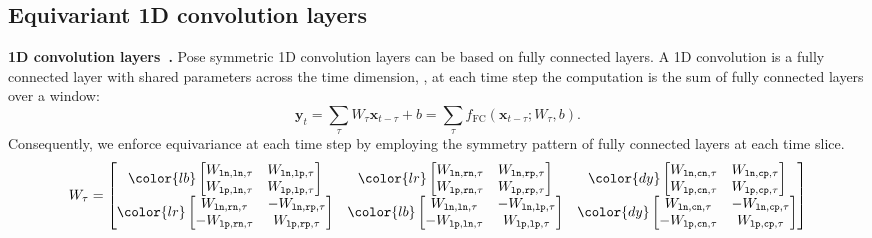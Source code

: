 \documentclass{article}
\def\rvx{{\mathbf{x}}}
\def\rvy{{\mathbf{y}}}
\begin{document}
\subsection{Equivariant 1D convolution layers}
{
\textbf{1D convolution layers~\cite{waibel1995phoneme, lecun1999object}.}
}
Pose symmetric 1D convolution layers can be based on fully connected layers. A 1D convolution is a fully connected layer with shared parameters across the time dimension, \ie, at each time step the computation is the sum of fully connected layers over a window:
$$\rvy_t = \sum\limits_{\tau} W_{\tau}\rvx_{t-\tau} + b = \sum\limits_{\tau}  f_{\text{FC}}(\rvx_{t-\tau}; W_{\tau}, b).$$ 
Consequently, we  enforce equivariance at each time step by employing the  symmetry pattern of fully connected layers at each time slice. 
$$
W_{\tau} = \begin{bmatrix}
{\color{lb}
\begin{bmatrix}
W_{\tt ln, ln, \tau} & W_{\tt ln, lp, \tau} \\
W_{\tt lp, ln, \tau} & W_{\tt lp, lp, \tau}\\
\end{bmatrix}
} 
& 
{\color{lr}
\begin{bmatrix}
W_{\tt ln, rn, \tau} & W_{\tt ln, rp, \tau} \\
W_{\tt lp,rn, \tau} & W_{\tt lp, rp, \tau}\\
\end{bmatrix}
}
&
{\color{dy}
\begin{bmatrix}
W_{\tt ln, cn, \tau} & W_{\tt ln, cp, \tau} \\
W_{\tt lp, cn, \tau} & W_{\tt lp, cp, \tau}\\
\end{bmatrix}
}\\
{\color{lr}
\begin{bmatrix}
W_{\tt ln, rn, \tau} & -W_{\tt ln, rp, \tau} \\
-W_{\tt lp,rn, \tau} & W_{\tt lp, rp, \tau}\\
\end{bmatrix}
}
& 
{\color{lb}
\begin{bmatrix}
W_{\tt ln, ln, \tau} & -W_{\tt ln, lp, \tau} \\
-W_{\tt lp, ln, \tau} & W_{\tt lp, lp, \tau}\\
\end{bmatrix}
} 
&
{\color{dy}
\begin{bmatrix}
W_{\tt ln, cn, \tau} & -W_{\tt ln, cp, \tau} \\
-W_{\tt lp, cn, \tau} & W_{\tt lp, cp, \tau}\\

\end{bmatrix}}
\end{bmatrix}$$
\end{document}
